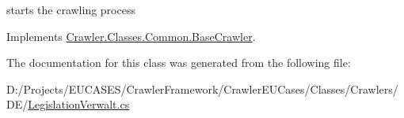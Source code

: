 starts the crawling process 



Implements \hyperlink{class_crawler_1_1_classes_1_1_common_1_1_base_crawler_a14b2a286ce7fb2899bd915dd345bf6b7}{Crawler.\-Classes.\-Common.\-Base\-Crawler}.



The documentation for this class was generated from the following file\-:\begin{DoxyCompactItemize}
\item 
D\-:/\-Projects/\-E\-U\-C\-A\-S\-E\-S/\-Crawler\-Framework/\-Crawler\-E\-U\-Cases/\-Classes/\-Crawlers/\-D\-E/\hyperlink{_legislation_verwalt_8cs}{Legislation\-Verwalt.\-cs}\end{DoxyCompactItemize}
